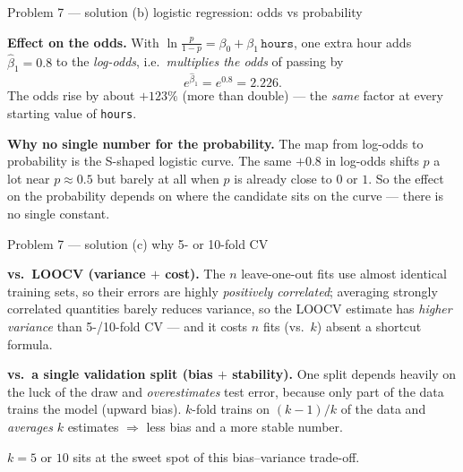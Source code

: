 \documentclass[aspectratio=169,11pt]{beamer}
\begin{document}
\begin{frame}{Problem 7 --- solution (b) logistic regression: odds vs probability}
  \begin{solutionbox}[Solution P7(b) --- coefficient on \texttt{hours} {$=0.8000$}]
    \textbf{Effect on the odds.} With $\ln\frac{p}{1-p}=\beta_0+\beta_1\,\texttt{hours}$, one
    extra hour adds $\hat\beta_1=0.8$ to the \emph{log-odds}, i.e.\ \emph{multiplies the odds} of
    passing by
    \[
      e^{\hat\beta_1}=e^{0.8}=\mathbf{2.226}.
    \]
    The odds rise by about $+123\%$ (more than double) --- the \emph{same} factor at every
    starting value of \texttt{hours}.
    \medskip

    \textbf{Why no single number for the probability.} The map from log-odds to probability is the
    S-shaped logistic curve. The same $+0.8$ in log-odds shifts $p$ a lot near $p\approx0.5$ but
    barely at all when $p$ is already close to $0$ or $1$. So the effect on the probability depends
    on where the candidate sits on the curve --- there is no single constant.
  \end{solutionbox}
\end{frame}

\begin{frame}{Problem 7 --- solution (c) why 5- or 10-fold CV}
  \begin{solutionbox}
    \textbf{vs.\ LOOCV (variance $+$ cost).} The $n$ leave-one-out fits use almost identical
    training sets, so their errors are highly \emph{positively correlated}; averaging strongly
    correlated quantities barely reduces variance, so the LOOCV estimate has \emph{higher
    variance} than 5-/10-fold CV --- and it costs $n$ fits (vs.\ $k$) absent a shortcut formula.
    \medskip

    \textbf{vs.\ a single validation split (bias $+$ stability).} One split depends heavily on the
    luck of the draw and \emph{overestimates} test error, because only part of the data trains the
    model (upward bias). $k$-fold trains on $(k-1)/k$ of the data and \emph{averages} $k$
    estimates $\Rightarrow$ less bias and a more stable number.
    \medskip

    $k=5$ or $10$ sits at the sweet spot of this bias--variance trade-off.
  \end{solutionbox}
\end{frame}
\end{document}
